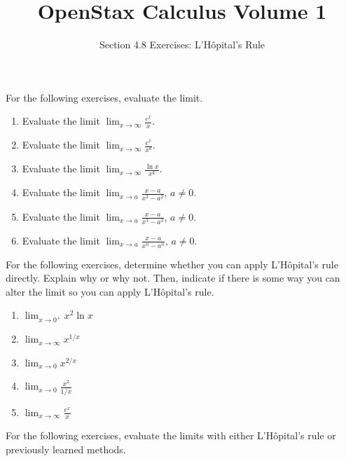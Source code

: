 \documentclass{exercises}
\title{OpenStax Calculus Volume 1}
\subtitle{Section 4.8 Exercises: L’Hôpital’s Rule}
\author{}
\date{}
\begin{document}
\maketitle


For the following exercises, evaluate the limit.

\begin{enumerate}[start=1]
\item Evaluate the limit $\lim_{x\to \infty}\frac{e^{x}}{x}$.
\item Evaluate the limit $\lim_{x\to \infty}\frac{e^{x}}{x^{k}}$.
\item Evaluate the limit $\lim_{x\to \infty}\frac{\ln x}{x^{k}}$.
\item Evaluate the limit $\lim_{x\to a}\frac{x-a}{x^{2}-a^{2}},\,a\ne0$.
\item Evaluate the limit $\lim_{x\to a}\frac{x-a}{x^{3}-a^{3}},\,a\ne0$.
\item Evaluate the limit $\lim_{x\to a}\frac{x-a}{x^{n}-a^{n}},\,a\ne0$.
\end{enumerate}

For the following exercises, determine whether you can apply L'Hôpital's rule directly. Explain why or why not. Then, indicate if there is some way you can alter the limit so you can apply L'Hôpital's rule.

\begin{enumerate}[resume]
\item $\lim_{x\to0^{+}}x^{2}\ln x$
\item $\lim_{x\to \infty}x^{1/x}$
\item $\lim_{x\to0}x^{2/x}$
\item $\lim_{x\to0}\frac{x^{2}}{1/x}$
\item $\lim_{x\to \infty}\frac{e^{x}}{x}$
\end{enumerate}

For the following exercises, evaluate the limits with either L'Hôpital's rule or previously learned methods.
\end{document}
